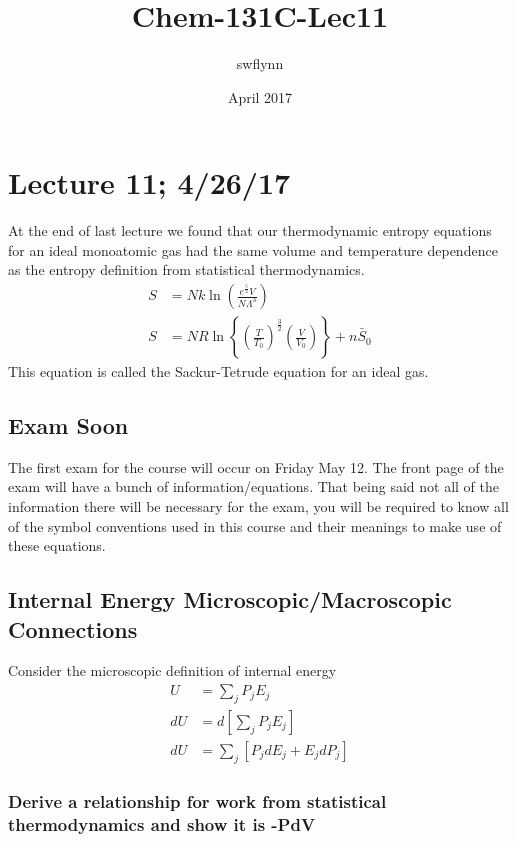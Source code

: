 \documentclass{article}
\title{Chem-131C-Lec11}
\author{swflynn }
\date{April 2017}
\begin{document}
\maketitle

\section*{Lecture 11; 4/26/17}
At the end of last lecture we found that our thermodynamic entropy equations for an ideal monoatomic gas had the same volume and temperature dependence as the entropy definition from statistical thermodynamics. 
\begin{equation}
\begin{split}
S &= Nk \ln \left( \frac{e^{\frac{5}{2}}V}{N\Lambda^3} \right) \\
S &= NR\ln \left \{ \left(\frac{T}{T_0}\right)^{\frac{3}{2}} \left(\frac{V}{V_0}\right) \right \}+n\bar{S}_0
\end{split}
\end{equation}
This equation is called the Sackur-Tetrude equation for an ideal gas. 

\subsection*{Exam Soon}
The first exam for the course will occur on Friday May 12. 
The front page of the exam will have a bunch of information/equations.
That being said not all of the information there will be necessary for the exam, you will be required to know all of the symbol conventions used in this course and their meanings to make use of these equations. 

\subsection*{Internal Energy Microscopic/Macroscopic Connections}
Consider the microscopic definition of internal energy 
\begin{equation}
\begin{split}
U &= \sum_j P_jE_j \\
dU &= d \left[\sum_j P_jE_j \right] \\
dU &= \sum_j [ P_jdE_j + E_j dP_j ]
\end{split}
\end{equation}

\subsubsection*{Derive a relationship for work from statistical thermodynamics and show it is -PdV}
\end{document}
